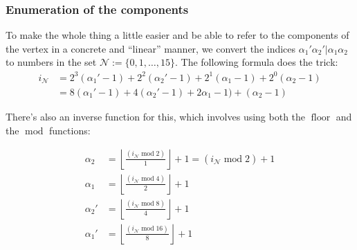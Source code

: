 \documentclass[12pt,a4paper,roman]{article}
\begin{document}
\subsubsection*{Enumeration of the components}
To make the whole thing a little easier and be able to refer to the components of the vertex in a concrete and ``linear'' manner, we convert the indices $\alpha_1'\alpha_2'|\alpha_1\alpha_2$ to numbers in the set $\mathcal{N} := \{0, 1, \dots, 15\}$. The following formula does the trick:
\begin{align}
i_\mathcal{N} &= 2^3(\alpha_1'-1)+2^2(\alpha_2'-1)+2^1(\alpha_1-1)+2^0(\alpha_2-1)\\
&= 8(\alpha_1'-1)+4(\alpha_2'-1)+2\alpha_1-1)+(\alpha_2-1)
\end{align}

There's also an inverse function for this, which involves using both the $\operatorname{floor}$
and the $\operatorname{mod}$ functions:

\begin{align}
\alpha_2 &= \left\lfloor{\frac{(i_\mathcal{N}\operatorname{mod}2)}{1}  }\right\rfloor +1 =(i_\mathcal{N}\operatorname{mod}2) +1\\
\alpha_1 &= \left\lfloor{\frac{(i_\mathcal{N}\operatorname{mod}4)}{2}  }\right\rfloor +1 \\
\alpha_2' &= \left\lfloor{\frac{(i_\mathcal{N}\operatorname{mod}8)}{4}  }\right\rfloor +1 \\
\alpha_1' &= \left\lfloor{\frac{(i_\mathcal{N}\operatorname{mod}16)}{8}  }\right\rfloor +1 
\end{align}
\end{document}
